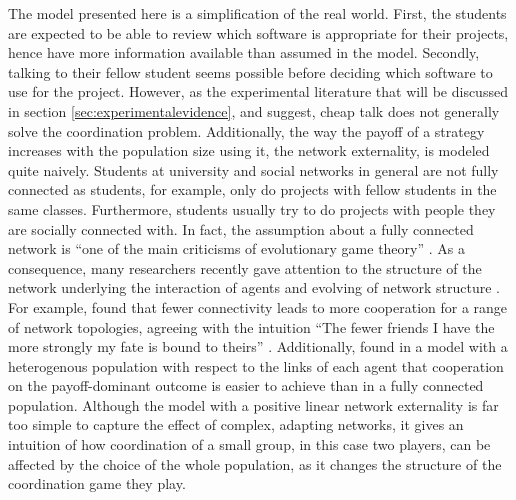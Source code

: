 The model presented here is a simplification of the real world. 
First, the students are expected to be able to review which software is 
appropriate for their projects, hence have more information available than 
assumed in the model. Secondly, talking to their fellow student seems
possible before deciding which software to use for the project. 
However, as the experimental literature that will be discussed in section 
\ref{sec:experimentalevidence}, and \textcite{aumann_nash_1990} suggest, 
cheap talk does not generally solve the coordination problem. 
Additionally, the way the payoff of a strategy increases with
the population size using it, the network externality, 
is modeled quite naively.
Students at university and social networks in general are not fully
connected as students, for example, only do projects with fellow students
in the same classes. Furthermore, students usually try to do projects
with people they are socially connected with. In fact, the assumption about
a fully connected network is ``one of the main criticisms of evolutionary game
theory'' \parencite[246]{hanauske_evolutionare_2011}. 
As a consequence, many researchers recently gave attention to the 
structure of the network underlying the interaction of agents and 
evolving of network structure \parencite[46]{szabo_evolutionary_2007}.
For example, \textcite{ohtsuki_simple_2006} found 
that fewer connectivity 
leads to more cooperation for a range of network topologies,
agreeing with the intuition
``The fewer friends I have the more strongly my fate is bound to theirs'' 
\parencite[1]{ohtsuki_simple_2006}.
Additionally, \textcite{santos_evolutionary_2006} found in a model with
a heterogenous population with respect to the links of each agent that 
cooperation on the payoff-dominant outcome is easier to achieve than
in a fully connected population.
Although the model with a positive linear network externality is far too 
simple to capture the effect of complex, adapting networks, it gives an 
intuition of how coordination of a small group, in this case two players, 
can be affected by the choice of the whole population, as it changes
the structure of the coordination game they play.
